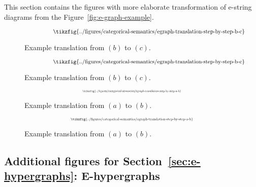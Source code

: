 This section contains the figures with more elaborate transformation of e-string diagrams from the Figure~\ref{fig:e-graph-example}.

\ifdefined\ONECOLUMN
\begin{figure}[htb!]
    \vspace{-3cm}
    \centering
    \[
        \hspace{1.3cm}
        \resizebox{0.8\textwidth}{!}{
        \tikzfig{../figures/categorical-semantics/egraph-translation-step-by-step-b-c}
        }
    \]
    \caption{Example translation from $(b)$ to $(c)$.}
    \label{fig:e-graph-example-b-c}
\end{figure}
\else
\begin{figure*}[htb!]
    \vspace{-3cm}
    \centering
    \[
        \hspace{1.3cm}
        \resizebox{0.8\textwidth}{!}{
        \tikzfig{../figures/categorical-semantics/egraph-translation-step-by-step-b-c}
        }
    \]
    \caption{Example translation from $(b)$ to $(c)$.}
    \label{fig:e-graph-example-b-c}
\end{figure*}
\fi

\ifdefined\ONECOLUMN
\begin{figure}[htb!]
    \[
        \scalebox{0.4}{
        \tikzfig{../figures/categorical-semantics/egraph-translation-step-by-step-a-b}
        }
    \]
    \caption{Example translation from $(a)$ to $(b)$.}
    \label{fig:e-graph-example-a-b}
\end{figure}
\else
\begin{figure*}[htb!]
    \[
        \scalebox{0.5}{
        \tikzfig{../figures/categorical-semantics/egraph-translation-step-by-step-a-b}
        }
    \]
    \caption{Example translation from $(a)$ to $(b)$.}
    \label{fig:e-graph-example-a-b}
\end{figure*}
\fi

\subsection{Additional figures for Section~\ref{sec:e-hypergraphs}: E-hypergraphs}
\label{sec:appendix:iso}

